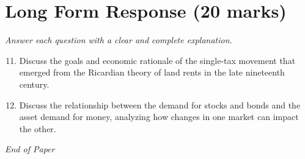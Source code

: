 \documentclass[12pt]{article}
\begin{document}
\section*{Long Form Response (20 marks)}
\textit{Answer each question with a clear and complete explanation.}
\begin{enumerate}[label=\arabic*.]
\setcounter{enumi}{10}
\item Discuss the goals and economic rationale of the single-tax movement that emerged from the Ricardian theory of land rents in the late nineteenth century.
\item Discuss the relationship between the demand for stocks and bonds and the asset demand for money, analyzing how changes in one market can impact the other.
\end{enumerate}

\vfill
\noindent\textit{End of Paper}
\end{document}
